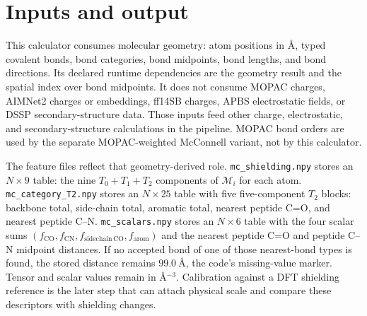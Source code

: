 \documentclass[11pt]{article}
\begin{document}
\section{Inputs and output}

This calculator consumes molecular geometry: atom positions in
\(\si{\angstrom}\), typed covalent bonds, bond categories, bond midpoints, bond
lengths, and bond directions. Its declared runtime dependencies are the geometry
result and the spatial index over bond midpoints. It does not consume MOPAC
charges, AIMNet2 charges or embeddings, ff14SB charges, APBS electrostatic
fields, or DSSP secondary-structure data. Those inputs feed other charge,
electrostatic, and secondary-structure calculations in the pipeline. MOPAC bond
orders are used by the separate MOPAC-weighted McConnell variant, not by this
calculator.

The feature files reflect that geometry-derived role. \texttt{mc\_shielding.npy}
stores an \(N\times 9\) table: the nine \(T_0+T_1+T_2\) components of
\(\mathcal M_i\) for each atom. \texttt{mc\_category\_T2.npy} stores an
\(N\times 25\) table with five five-component \(T_2\) blocks: backbone total,
side-chain total, aromatic total, nearest peptide C=O, and nearest peptide
C--N. \texttt{mc\_scalars.npy} stores an \(N\times 6\) table with the four scalar sums
\((f_{\mathrm{CO}},f_{\mathrm{CN}},f_{\mathrm{sidechain\,CO}},f_{\mathrm{arom}})\)
and the nearest peptide C=O and peptide C--N midpoint distances. If no accepted
bond of one of those nearest-bond types is found, the stored distance remains
\(\SI{99.0}{\angstrom}\), the code's missing-value marker. Tensor and scalar
values remain in \(\si{\angstrom^{-3}}\). Calibration against a DFT shielding
reference is the later step that can attach physical scale and compare these
descriptors with shielding changes.
\end{document}
